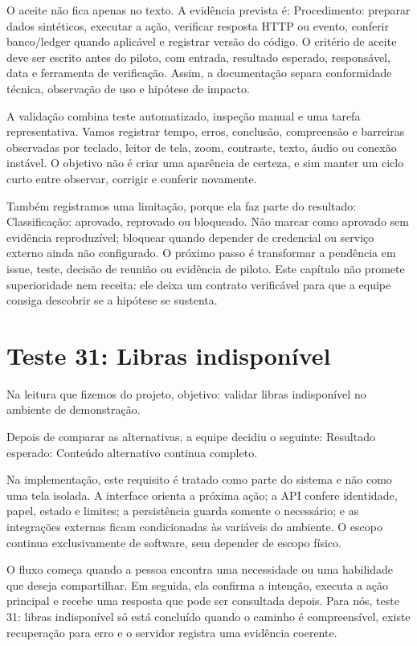 \documentclass[12pt,oneside,a4paper,article]{abntex2}
\begin{document}
O aceite não fica apenas no texto. A evidência prevista é: Procedimento: preparar dados sintéticos, executar a ação, verificar resposta HTTP ou evento, conferir banco/ledger quando aplicável e registrar versão do código. O critério de aceite deve ser escrito antes do piloto, com entrada, resultado esperado, responsável, data e ferramenta de verificação. Assim, a documentação separa conformidade técnica, observação de uso e hipótese de impacto.

A validação combina teste automatizado, inspeção manual e uma tarefa representativa. Vamos registrar tempo, erros, conclusão, compreensão e barreiras observadas por teclado, leitor de tela, zoom, contraste, texto, áudio ou conexão instável. O objetivo não é criar uma aparência de certeza, e sim manter um ciclo curto entre observar, corrigir e conferir novamente.

Também registramos uma limitação, porque ela faz parte do resultado: Classificação: aprovado, reprovado ou bloqueado. Não marcar como aprovado sem evidência reproduzível; bloquear quando depender de credencial ou serviço externo ainda não configurado. O próximo passo é transformar a pendência em issue, teste, decisão de reunião ou evidência de piloto. Este capítulo não promete superioridade nem receita: ele deixa um contrato verificável para que a equipe consiga descobrir se a hipótese se sustenta.

\section{Teste 31: Libras indisponível}
Na leitura que fizemos do projeto, objetivo: validar libras indisponível no ambiente de demonstração.

Depois de comparar as alternativas, a equipe decidiu o seguinte: Resultado esperado: Conteúdo alternativo continua completo.

Na implementação, este requisito é tratado como parte do sistema e não como uma tela isolada. A interface orienta a próxima ação; a API confere identidade, papel, estado e limites; a persistência guarda somente o necessário; e as integrações externas ficam condicionadas às variáveis do ambiente. O escopo continua exclusivamente de software, sem depender de escopo físico.

O fluxo começa quando a pessoa encontra uma necessidade ou uma habilidade que deseja compartilhar. Em seguida, ela confirma a intenção, executa a ação principal e recebe uma resposta que pode ser consultada depois. Para nós, teste 31: libras indisponível só está concluído quando o caminho é compreensível, existe recuperação para erro e o servidor registra uma evidência coerente.
\end{document}
